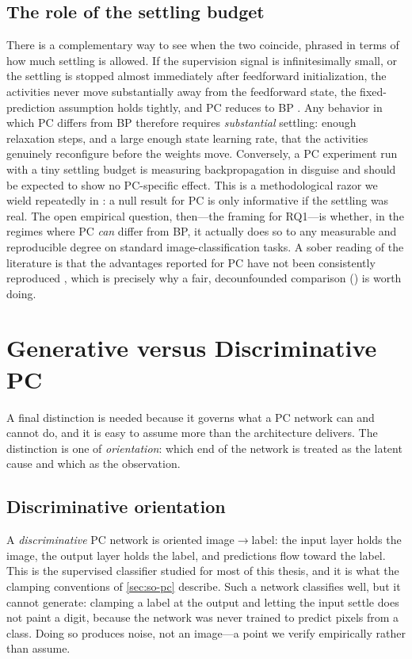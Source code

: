 \subsection{The role of the settling budget}

There is a complementary way to see when the two coincide, phrased in terms of how much settling is
allowed. If the supervision signal is infinitesimally small, or the settling is stopped almost
immediately after feedforward initialization, the activities never move substantially away from
the feedforward state, the fixed-prediction assumption holds tightly, and PC reduces to BP
\citep{song2024prospective}. Any behavior in which PC differs from BP therefore requires
\emph{substantial} settling: enough relaxation steps, and a large enough state learning rate, that
the activities genuinely reconfigure before the weights move. Conversely, a PC experiment run with
a tiny settling budget is measuring backpropagation in disguise and should be expected to show no
PC-specific effect. This is a methodological razor we wield repeatedly in :
a null result for PC is only informative if the settling was real. The open empirical question,
then---the framing for RQ1---is whether, in the regimes where PC \emph{can} differ from BP, it
actually does so to any measurable and reproducible degree on standard image-classification tasks.
A sober reading of the literature is that the advantages reported for PC have not been consistently
reproduced \citep{zahid2023curvature}, which is precisely why a fair, decounfounded comparison
() is worth doing.

\section{Generative versus Discriminative PC}\label{sec:gen-disc}

A final distinction is needed because it governs what a PC network can and cannot do, and it is
easy to assume more than the architecture delivers. The distinction is one of \emph{orientation}:
which end of the network is treated as the latent cause and which as the observation.

\subsection{Discriminative orientation}

A \emph{discriminative} PC network is oriented image$\to$label: the input layer holds the image,
the output layer holds the label, and predictions flow toward the label. This is the supervised
classifier studied for most of this thesis, and it is what the clamping conventions of
\cref{sec:so-pc} describe. Such a network classifies well, but it cannot generate: clamping a
label at the output and letting the input settle does not paint a digit, because the network was
never trained to predict pixels from a class. Doing so produces noise, not an image---a point we
verify empirically rather than assume.

